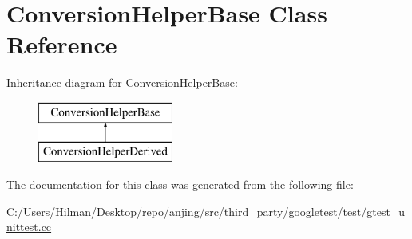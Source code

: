 \hypertarget{class_conversion_helper_base}{}\section{Conversion\+Helper\+Base Class Reference}
\label{class_conversion_helper_base}
Inheritance diagram for Conversion\+Helper\+Base\+:\begin{figure}[H]
\begin{center}
\leavevmode
\includegraphics[height=2.000000cm]{class_conversion_helper_base}
\end{center}
\end{figure}


The documentation for this class was generated from the following file\+:\begin{DoxyCompactItemize}
\item 
C\+:/\+Users/\+Hilman/\+Desktop/repo/anjing/src/third\+\_\+party/googletest/test/\hyperlink{gtest__unittest_8cc}{gtest\+\_\+unittest.\+cc}\end{DoxyCompactItemize}
